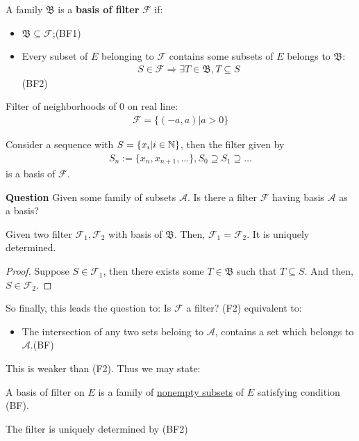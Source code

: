 \documentclass[Total.tex]{subfiles}
\begin{document}
				\begin{Def}
					A family $\mathfrak{B}$ is a \textbf{basis of filter} $\mathcal{F}$ if:
					\begin{itemize}
						\item $\mathfrak{B}\subseteq \mathcal{F}$;(BF1)
						\item Every subset of $E$ belonging to $\mathcal{F}$ contains some subsets of $E$ belongs to $\mathfrak{B}$:
						\begin{gather*}
							S\in \mathcal{F}\Rightarrow \exists T\in \mathfrak{B}, T\subseteq S
						\end{gather*}(BF2)
					\end{itemize}
				\end{Def}
				
				\begin{example}
					Filter of neighborhoods of $0$ on real line:
					\begin{gather*}
						\mathcal{F}=\{(-a,a)|a>0\}
					\end{gather*}
				\end{example}
				
				\begin{example}
					Consider a sequence with $S=\{x_i|i\in \mathbb{N}\}$, then the filter given by
					\begin{gather*}
						S_n:=\{x_n,x_{n+1},\dots\},S_0\supseteq S_1\supseteq \dots	 
					\end{gather*}
					is a basis of $\mathcal{F}$.
				\end{example}
				
				\textbf{Question} Given some family of subsets $\mathcal{A}$. Is there a filter $\mathcal{F}$ having basis $\mathcal{A}$ as a basis?
				
				\begin{lemma}
					Given two filter $\mathcal{F}_1,\mathcal{F}_2$ with basis of $\mathfrak{B}$. Then, $\mathcal{F}_1=\mathcal{F}_2$. It is uniquely determined.
				\end{lemma}
				\begin{proof}
					Suppose $S\in \mathcal{F}_1$, then there exists some $T\in \mathfrak{B}$ such that $T\subseteq S$. And then, $S\in \mathcal{F}_2$.
				\end{proof}
				
				So finally, this leads the question to: Is $\mathcal{F}$ a filter? (F2) equivalent to:
				\begin{itemize}
					\item The intersection of any two sets beloing to $\mathcal{A}$, contains a set which belongs to $\mathcal{A}$.(BF)
				\end{itemize}
				This is weaker than (F2). Thus we may state:
				\begin{center}
					A basis of filter on $E$ is a family of \underline{nonempty subsets} of $E$ satisfying condition (BF).
				\end{center}
				The filter is uniquely determined by (BF2)
				
\end{document}
